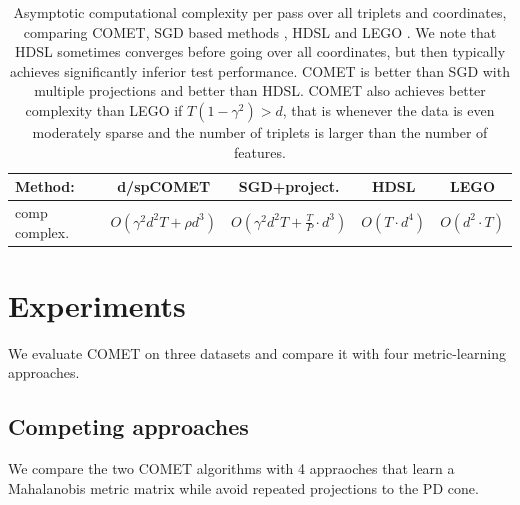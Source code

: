 \documentclass[twoside,11pt]{article}
\begin{document}
\begin{table}[t]
\captionsetup{font=small}
\caption{Asymptotic computational complexity per pass over all triplets and coordinates, comparing COMET, SGD based methods \citep{OASIS, qian}, HDSL \citep{HDSL} and LEGO \citep{lego}. We note that HDSL sometimes converges before going over all coordinates, but then typically achieves significantly inferior test performance. COMET is better than SGD with multiple projections and better than HDSL. COMET also achieves better complexity than LEGO if $T(1-\gamma^2) > d$, that is whenever the data is even moderately sparse and the number of triplets is larger than the number of features.}
\label{comp-complx}
\vskip 0.15in
\begin{center}
\begin{small}
\begin{sc}
\begin{tabular}{lcccc}
\hline
Method: & d/spCOMET  & SGD+project.  & HDSL    & LEGO         \\ 
\hline
comp complex. & $O(\gamma^2 d^2 T +  \rho d^3)$&  $O(\gamma^2 d^2 T + \frac{T}{P} \cdot d^3)$
&   $O( T\cdot  d^4)$ &   $O(d^2 \cdot T)$  \\
\hline
\end{tabular}
\end{sc}
\end{small}
\end{center}
\vskip -0.1in
\end{table}



\section{Experiments}
We evaluate COMET on three datasets and compare it with four metric-learning approaches. 

\subsection{Competing approaches}
We compare the two COMET algorithms with 4 appraoches that learn a Mahalanobis metric matrix while avoid repeated projections to the PD cone.
\end{document}
